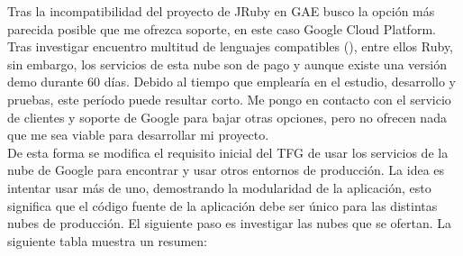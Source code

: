 Tras la incompatibilidad del proyecto de JRuby en GAE busco la opción más parecida posible que me ofrezca soporte, en este caso Google Cloud Platform. Tras investigar encuentro multitud de lenguajes compatibles (\cite{URL:Lenguajes_GoogleCloud}), entre ellos Ruby, sin embargo, los servicios de esta nube son de pago y aunque existe una versión demo durante 60 días. Debido al tiempo que emplearía en el estudio, desarrollo y pruebas, este período puede resultar corto. Me pongo en contacto con el servicio de clientes y soporte de Google para bajar otras opciones, pero no ofrecen nada que me sea viable para desarrollar mi proyecto.\\

De esta forma se modifica el requisito inicial del TFG de usar los servicios de la nube de Google para encontrar y usar otros entornos de producción. La idea es intentar usar más de uno, demostrando la modularidad de la aplicación, esto significa que el código fuente de la aplicación debe ser único para las distintas nubes de producción. El siguiente paso es investigar las nubes que se ofertan. La siguiente tabla muestra un resumen:

